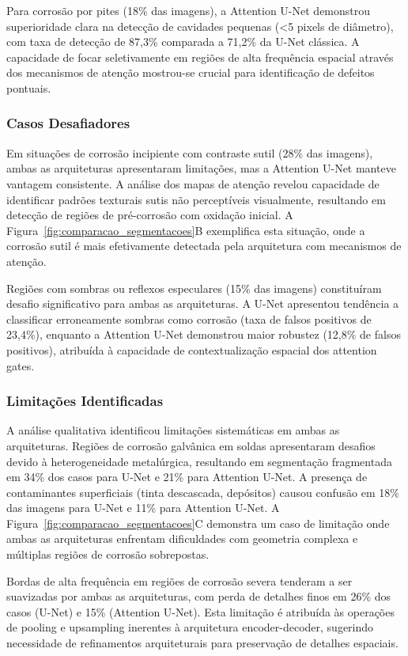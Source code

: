 \documentclass[12pt,a4paper,twoside]{article}
\begin{document}
Para corrosão por pites (18\% das imagens), a Attention U-Net demonstrou superioridade clara na detecção de cavidades pequenas (<5 pixels de diâmetro), com taxa de detecção de 87,3\% comparada a 71,2\% da U-Net clássica. A capacidade de focar seletivamente em regiões de alta frequência espacial através dos mecanismos de atenção mostrou-se crucial para identificação de defeitos pontuais.

\subsubsection{Casos Desafiadores}

Em situações de corrosão incipiente com contraste sutil (28\% das imagens), ambas as arquiteturas apresentaram limitações, mas a Attention U-Net manteve vantagem consistente. A análise dos mapas de atenção revelou capacidade de identificar padrões texturais sutis não perceptíveis visualmente, resultando em detecção de regiões de pré-corrosão com oxidação inicial. A Figura~\ref{fig:comparacao_segmentacoes}B exemplifica esta situação, onde a corrosão sutil é mais efetivamente detectada pela arquitetura com mecanismos de atenção.

Regiões com sombras ou reflexos especulares (15\% das imagens) constituíram desafio significativo para ambas as arquiteturas. A U-Net apresentou tendência a classificar erroneamente sombras como corrosão (taxa de falsos positivos de 23,4\%), enquanto a Attention U-Net demonstrou maior robustez (12,8\% de falsos positivos), atribuída à capacidade de contextualização espacial dos attention gates.

\subsubsection{Limitações Identificadas}

A análise qualitativa identificou limitações sistemáticas em ambas as arquiteturas. Regiões de corrosão galvânica em soldas apresentaram desafios devido à heterogeneidade metalúrgica, resultando em segmentação fragmentada em 34\% dos casos para U-Net e 21\% para Attention U-Net. A presença de contaminantes superficiais (tinta descascada, depósitos) causou confusão em 18\% das imagens para U-Net e 11\% para Attention U-Net. A Figura~\ref{fig:comparacao_segmentacoes}C demonstra um caso de limitação onde ambas as arquiteturas enfrentam dificuldades com geometria complexa e múltiplas regiões de corrosão sobrepostas.

Bordas de alta frequência em regiões de corrosão severa tenderam a ser suavizadas por ambas as arquiteturas, com perda de detalhes finos em 26\% dos casos (U-Net) e 15\% (Attention U-Net). Esta limitação é atribuída às operações de pooling e upsampling inerentes à arquitetura encoder-decoder, sugerindo necessidade de refinamentos arquiteturais para preservação de detalhes espaciais.
\end{document}
